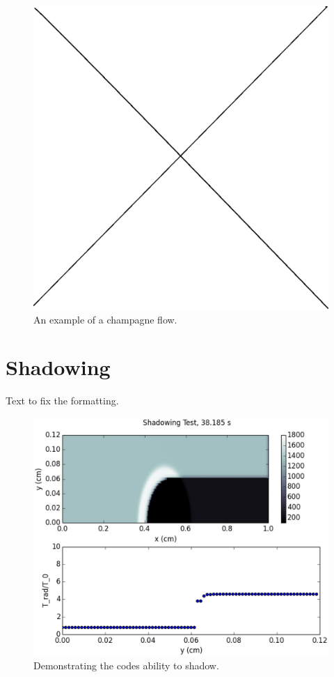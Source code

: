 \begin{figure}
\includegraphics[width=\textwidth]{graphics/placeholder.eps}
\caption[An example of a champagne flow.]{An example of a champagne flow.}
\label{fig:champagne}
\end{figure}

\section{Shadowing}
\label{sec:shadowing}

Text to fix the formatting.

\begin{figure}
\includegraphics[width=\textwidth]{graphics/shadow10000.eps}
\caption[Shadowing.]{Demonstrating the codes ability to shadow.}
\label{fig:shadow}
\end{figure}


